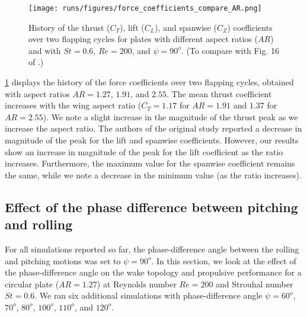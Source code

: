 \begin{figure}
  \centering
  \texttt{[image: runs/figures/force\_coefficients\_compare\_AR.png]}
  \caption{History of the thrust ($C_T$), lift ($C_L$), and spanwise ($C_Z$) coefficients over two flapping cycles for plates with different aspect ratios ($AR$) and with $St = 0.6$, $Re = 200$, and $\psi = 90^o$. (To compare with Fig. 16 of \citet{li_dong_2016}.)}
  \label{fig:ratio_force_coefficients}
\end{figure}

\cref{fig:ratio_force_coefficients} displays the history of the force coefficients over two flapping cycles, obtained with aspect ratios $AR = 1.27$, $1.91$, and $2.55$.
The mean thrust coefficient increases with the wing aspect ratio ($\overline{C_T} = 1.17$ for $AR = 1.91$ and $1.37$ for $AR = 2.55$).
We note a slight increase in the magnitude of the thrust peak as we increase the aspect ratio.
The authors of the original study reported a decrease in magnitude of the peak for the lift and spanwise coefficients.
However, our results show an increase in magnitude of the peak for the lift coefficient as the ratio increases.
Furthermore, the maximum value for the spanwise coefficient remains the same, while we note a decrease in the minimum value (as the ratio increases).

\subsection{Effect of the phase difference between pitching and rolling}

For all simulations reported so far, the phase-difference angle between the rolling and pitching motions was set to $\psi = 90^o$.
In this section, we look at the effect of the phase-difference angle on the wake topology and propulsive performance for a circular plate ($AR = 1.27$) at Reynolds number $Re = 200$ and Strouhal number $St = 0.6$.
We ran six additional simulations with phase-difference angle $\psi = 60^o$, $70^o$, $80^o$, $100^o$, $110^o$, and $120^o$.

